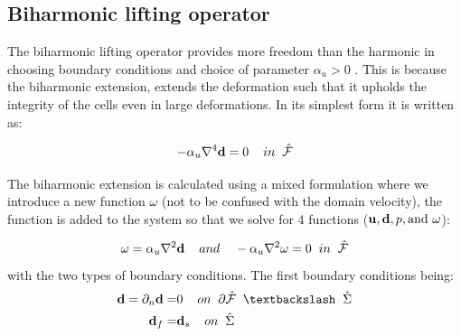 \subsection{Biharmonic lifting operator} 
The biharmonic lifting operator provides more freedom than the harmonic in choosing boundary conditions and choice of parameter $\alpha_u > 0$ \cite{MM2016,Wick2011a}. This is because the biharmonic extension, extends the deformation such that it upholds the integrity of the cells even in large deformations. In its simplest form it is written as:

\begin{equation}
- \alpha_u \nabla^4 \bold{d} = 0 \hspace{4mm}  in \hspace{2mm} \hat{\mathcal{F}}\\
\end{equation}

The biharmonic extension is calculated using a mixed formulation where we introduce a new function $\omega$ (not to be confused with the domain velocity), the function is added to the system so that we solve for 4 functions ($\bold{u}, \bold{d}, p, \text{and } \omega$):
 
\begin{equation}
\omega = \alpha_u \nabla^2 \bold{d} \hspace{4mm} and \hspace{4mm} - \alpha_u \nabla^2 \omega = 0 \hspace{2mm}   in \hspace{2mm} \hat{\mathcal{F}}
\end{equation}
with the two types of boundary conditions. The first boundary conditions being:
\begin{align}
\bold{d} = \partial_n \bold{d} =& 0 \hspace{4mm} on \hspace{2mm} \partial \hat{\mathcal{F}} \hspace{2mm} \textbackslash \hspace{2mm} \hat{\Sigma}\\
\bold{d}_f =& \bold{d}_s \hspace{4mm } on \hspace{2mm } \hat{\Sigma} 
\end{align}

